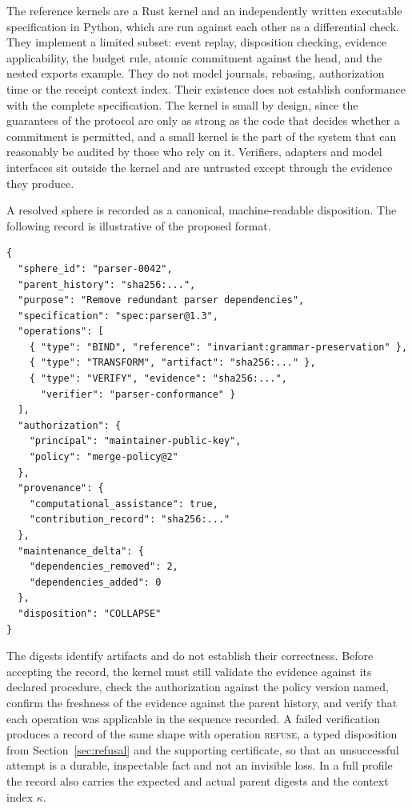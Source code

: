 \documentclass[11pt]{article}
\theoremstyle{remark}
\newcommand{\REFUSE}{\textsc{refuse}}
\begin{document}
The reference kernels are a Rust kernel and an independently written executable specification in Python, which are run against each other as a differential check. They implement a limited subset: event replay, disposition checking, evidence applicability, the budget rule, atomic commitment against the head, and the nested exports example. They do not model journals, rebasing, authorization time or the receipt context index. Their existence does not establish conformance with the complete specification. The kernel is small by design, since the guarantees of the protocol are only as strong as the code that decides whether a commitment is permitted, and a small kernel is the part of the system that can reasonably be audited by those who rely on it. Verifiers, adapters and model interfaces sit outside the kernel and are untrusted except through the evidence they produce.

A resolved sphere is recorded as a canonical, machine-readable disposition. The following record is illustrative of the proposed format.

{\small
\begin{verbatim}
{
  "sphere_id": "parser-0042",
  "parent_history": "sha256:...",
  "purpose": "Remove redundant parser dependencies",
  "specification": "spec:parser@1.3",
  "operations": [
    { "type": "BIND", "reference": "invariant:grammar-preservation" },
    { "type": "TRANSFORM", "artifact": "sha256:..." },
    { "type": "VERIFY", "evidence": "sha256:...",
      "verifier": "parser-conformance" }
  ],
  "authorization": {
    "principal": "maintainer-public-key",
    "policy": "merge-policy@2"
  },
  "provenance": {
    "computational_assistance": true,
    "contribution_record": "sha256:..."
  },
  "maintenance_delta": {
    "dependencies_removed": 2,
    "dependencies_added": 0
  },
  "disposition": "COLLAPSE"
}
\end{verbatim}
}

The digests identify artifacts and do not establish their correctness. Before accepting the record, the kernel must still validate the evidence against its declared procedure, check the authorization against the policy version named, confirm the freshness of the evidence against the parent history, and verify that each operation was applicable in the sequence recorded. A failed verification produces a record of the same shape with operation \REFUSE, a typed disposition from Section~\ref{sec:refusal} and the supporting certificate, so that an unsuccessful attempt is a durable, inspectable fact and not an invisible loss. In a full profile the record also carries the expected and actual parent digests and the context index $\kappa$.
\end{document}
